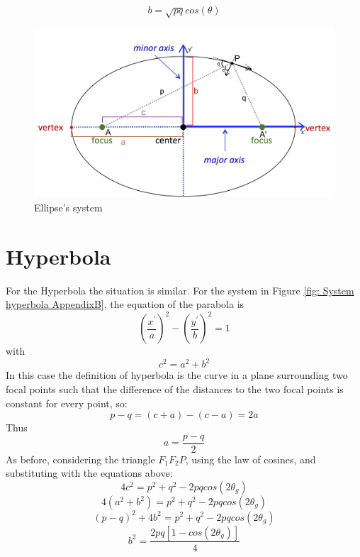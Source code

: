 \begin{equation}
b = \sqrt{p q} cos (\theta)
\end{equation}
\begin{figure}[H]
%
\centering
%
\includegraphics[width=.6\textwidth]{Immagini/AppendixB/EllipseSystem3}
%
\caption{Ellipse's system}
%
\label{fig: System AppendixB}
%
\end{figure}
\section{Hyperbola}
For the Hyperbola the situation is similar. For the system in Figure \ref{fig: System hyperbola AppendixB}, the equation of the parabola is
\begin{equation}
\left( \frac{x^{'}}{a} \right)^2 - \left( \frac{y^{'}}{b} \right)^2 = 1
\end{equation}
with
\begin{equation}
c^2 = a^2 + b^2
\end{equation}
In this case the definition of hyperbola is the curve in a plane surrounding two focal points such that the difference of the distances to the two focal points is constant for every point, so:
\begin{equation}
p - q = (c + a) - (c - a) = 2 a
\end{equation}
Thus
\begin{equation}
a = \frac{p - q}{2}
\end{equation}
As before, considering the triangle $F_1 F_2 P $, using the law of cosines, and substituting with the equations above:
\begin{equation}
4 c^2 = p^2 + q^2 - 2 p q cos (2 \theta_g)
\end{equation}
\begin{equation}
4 (a^2 + b^2) = p^2 + q^2 - 2 p q cos ( 2 \theta_g)
\end{equation} 
\begin{equation}
(p - q)^2 + 4 b^2 = p^2 + q^2 - 2 p q cos (2 \theta_g)
\end{equation}
\begin{equation}
b^2 = \frac{2 p q [1 - cos (2 \theta_g)]}{4}
\end{equation}
